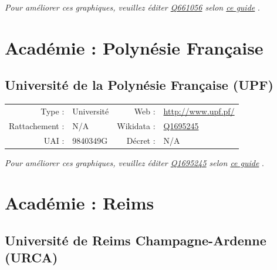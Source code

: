 \documentclass[12pt,french,landscape]{article}
\begin{document}
\textit{\scriptsize Pour améliorer ces graphiques, veuillez éditer \href{https://www.wikidata.org/entity/Q661056}{Q661056}  selon \href{https://github.com/cpesr/wikidataESR/blob/master/Rmd/wikidataESR.md}{ce guide}}
.


\newpage

\hypertarget{acaduxe9mie-polynuxe9sie-franuxe7aise}{%
\section{Académie : Polynésie
Française}\label{acaduxe9mie-polynuxe9sie-franuxe7aise}}

\hypertarget{universituxe9-de-la-polynuxe9sie-franuxe7aise-upf}{%
\subsection{Université de la Polynésie Française
(UPF)}\label{universituxe9-de-la-polynuxe9sie-franuxe7aise-upf}}

\begin{tabular*}{0.45\textwidth}{rp{2cm}rl}  
\hline  
Type : & Université & Web : &\href{http://www.upf.pf/}{http://www.upf.pf/} \\  
Rattachement : & N/A & Wikidata : & \href{https://www.wikidata.org/entity/Q1695245}{Q1695245} \\  
UAI : & 9840349G & Décret : & N/A \\  
\hline  
\end{tabular*}

\textit{\scriptsize Pour améliorer ces graphiques, veuillez éditer \href{https://www.wikidata.org/entity/Q1695245}{Q1695245}  selon \href{https://github.com/cpesr/wikidataESR/blob/master/Rmd/wikidataESR.md}{ce guide}}
.


\newpage

\hypertarget{acaduxe9mie-reims}{%
\section{Académie : Reims}\label{acaduxe9mie-reims}}

\hypertarget{universituxe9-de-reims-champagne-ardenne-urca}{%
\subsection{Université de Reims Champagne-Ardenne
(URCA)}\label{universituxe9-de-reims-champagne-ardenne-urca}}
\end{document}
